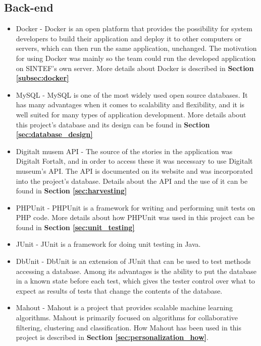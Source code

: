 \subsection{Back-end}
\begin{itemize}
	\item Docker \cite{EHW2} - Docker is an open platform that provides the possibility for system developers to build their application and deploy it to other computers or servers, which can then run the same application, unchanged. The motivation for using Docker was mainly so the team could run the developed application on SINTEF's own server. More details about Docker is described in \textbf{Section \ref{subsec:docker}}
	\item MySQL \cite{es8} - MySQL is one of the most widely used open source databases. It has many advantages when it comes to scalability and flexibility, and it is well suited for many types of application development. More details about this project's database and its design can be found in \textbf{Section \ref{sec:database_design}}
	\item Digitalt musem API \cite{digitaltMuseum} - The source of the stories in the application was Digitalt Fortalt, and in order to access these it was necessary to use Digitalt museum's API. The API is documented on its website and was incorporated into the project's database. Details about the API and the use of it can be found in \textbf{Section \ref{sec:harvesting}}
	\item PHPUnit \cite{KF2} - PHPUnit is a framework for writing and performing unit tests on PHP code. More details about how PHPUnit was used in this project can be found in \textbf{Section \ref{sec:unit_testing}}
	\item JUnit \cite{jUnit} - JUnit is a framework for doing unit testing in Java. 
	\item DbUnit \cite{dbUnit} - DbUnit is an extension of JUnit that can be used to test methods accessing a database. Among its advantages is the ability to put the database in a known state before each test, which gives the tester control over what to expect as results of tests that change the contents of the database.
	\item Mahout \cite{as9}  - Mahout is a project that provides scalable machine learning algorithms. Mahout is primarily focused on algorithms for collaborative filtering, clustering and classification. How Mahout has been used in this project is described in \textbf{Section \ref{sec:personalization_how}}.
\end{itemize}


